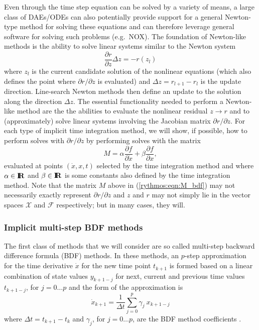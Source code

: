 \documentclass[pdf,ps2pdf,11pt]{SANDreport}
\begin{document}
Even through the time step equation can be solved by a variety of means, a
large class of DAEs/ODEs can also potentially provide support for a general
Newton-type method for solving these equations and can therefore leverage
general software for solving such problems (e.g.\ NOX).  The foundation of
Newton-like methods is the ability to solve linear systems similar to the
Newton system
%
\begin{equation}
\frac{\partial r}{\partial z} \Delta z = - r(z_l)
\end{equation}
%
where $z_l$ is the current candidate solution of the nonlinear equations
(which also defines the point where $\partial r / {}\partial z$ is evaluated)
and $\Delta z = r_{l+1} - r_l$ is the update direction.  Line-search Newton
methods then define an update to the solution along the direction $\Delta z$.
The essential functionality needed to perform a Newton-like method are the the
abilities to evaluate the nonlinear residual $z {}\rightarrow r$ and to
(approximately) solve linear systems involving the Jacobian matrix ${}\partial
r / {}\partial z$.  For each type of implicit time integration method, we will
show, if possible, how to perform solves with ${}\partial r / {}\partial z$ by
performing solves with the matrix
%
\begin{equation}
M = \alpha \frac{\partial f}{\partial \dot{x}} + \beta \frac{\partial f}{\partial x},
\label{rythmos:eqn:M}
\end{equation}
%
evaluated at points $(\dot{x},x,t)$ selected by the time integration method
and where $\alpha\in\mbox{\textbf{I}}\hspace{-0.6ex}\mbox{\textbf{R}}$ and $\beta\in\mbox{\textbf{I}}\hspace{-0.6ex}\mbox{\textbf{R}}$ is some constants also defined by
the time integration method.  Note that the matrix $M$ above in
(\ref{rythmos:eqn:M_bdf}) may not necessarily exactly represent ${}\partial r
/ {}\partial z$ and $z$ and $r$ may not simply lie in the vector spaces
$\mathcal{X}$ and $\mathcal{F}$ respectively; but in many cases, they will.

\subsubsection{Implicit multi-step BDF methods}

The first class of methods that we will consider are so called multi-step
backward difference formula (BDF) methods.  In these methods, an $p$-step
approximation for the time derivative $\dot{x}$ for the new time point
$t_{k+1}$ is formed based on a linear combination of state values $y_{k+1-j}$
for next, current and previous time values $t_{k+1-j}$, for $j = 0 {}\ldots p$
and the form of the approximation is
%
\begin{equation}
\dot{x}_{k+1} = \frac{1}{\Delta t} \sum_{j=0}^{p} \gamma_j \: x_{k+1-j}
\label{rythmos:eqn:bdf_x_dot}
\end{equation}
%
where $\Delta t = t_{k+1} - t_k$ and $\gamma_j$, for $j=0 {}\ldots p$, are the
BDF method coefficients \cite{AscherPetzold}.
\end{document}
